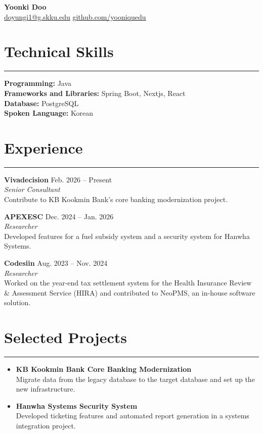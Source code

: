 \documentclass[letterpaper,11pt]{article}
\begin{document}
\begin{center}
    {\LARGE\bfseries Yoonki Doo}\\[5pt]
    \href{mailto:doyungi1@g.skku.edu}{doyungi1@g.skku.edu}
    \enspace\textbar\enspace
    \href{https://github.com/yooniquedu}{github.com/yooniquedu}
\end{center}

\section*{Technical Skills}
\hrule
\vspace{6pt}
\textbf{Programming:} Java\\
\textbf{Frameworks and Libraries:} Spring Boot, Nextjs, React\\
\textbf{Database:} PostgreSQL\\
\textbf{Spoken Language:} Korean

\section*{Experience}
\hrule
\vspace{6pt}

\textbf{Vivadecision} \hfill Feb. 2026 -- Present\\
\textit{Senior Consultant}\\
Contribute to KB Kookmin Bank's core banking modernization project.

\medskip
\textbf{APEXESC} \hfill Dec. 2024 -- Jan. 2026\\
\textit{Researcher}\\
Developed features for a fuel subsidy system and a security system for Hanwha Systems.

\medskip
\textbf{Codesiin} \hfill Aug. 2023 -- Nov. 2024\\
\textit{Researcher}\\
Worked on the year-end tax settlement system for the Health Insurance Review \& Assessment Service (HIRA) and contributed to NeoPMS, an in-house software solution.

\section*{Selected Projects}
\hrule
\vspace{6pt}
\begin{itemize}
    \item \textbf{KB Kookmin Bank Core Banking Modernization}\\
    Migrate data from the legacy database to the target database and set up the new infrastructure.
    \item \textbf{Hanwha Systems Security System}\\
    Developed ticketing features and automated report generation in a systems integration project.
\end{itemize}
\end{document}
